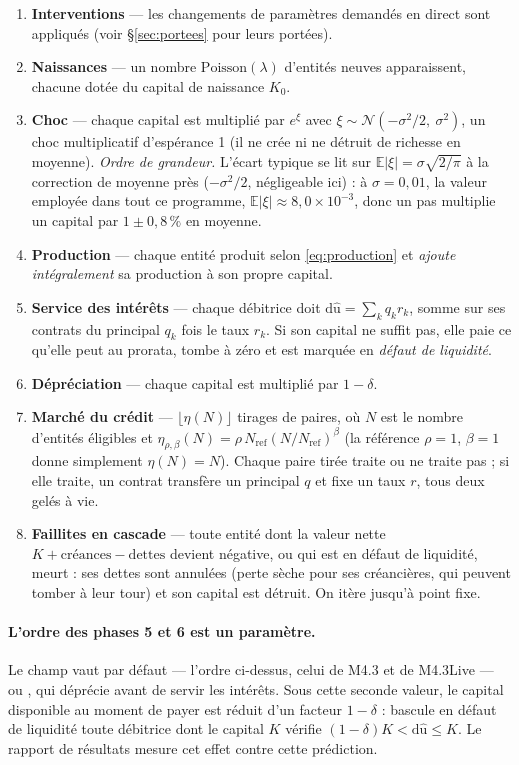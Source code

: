 \begin{enumerate}
\item \textbf{Interventions} --- les changements de paramètres demandés en
  direct sont appliqués (voir §\ref{sec:portees} pour leurs portées).
\item \textbf{Naissances} --- un nombre $\mathrm{Poisson}(\lambda)$ d'entités
  neuves apparaissent, chacune dotée du capital de naissance $K_0$.
\item \textbf{Choc} --- chaque capital est multiplié par $e^{\xi}$ avec
  $\xi \sim \mathcal{N}(-\sigma^2/2,\ \sigma^2)$, un choc multiplicatif
  d'espérance 1 (il ne crée ni ne détruit de richesse en moyenne).
  \emph{Ordre de grandeur.} L'écart typique se lit sur
  $\mathbb{E}|\xi| = \sigma\sqrt{2/\pi}$ à la correction de moyenne près
  ($-\sigma^2/2$, négligeable ici) : à $\sigma = 0{,}01$, la valeur employée
  dans tout ce programme, $\mathbb{E}|\xi| \approx 8{,}0\times10^{-3}$, donc
  un pas multiplie un capital par $1 \pm 0{,}8\,\%$ en moyenne.
\item \textbf{Production} --- chaque entité produit selon
  \eqref{eq:production} et \emph{ajoute intégralement} sa production à son
  propre capital.
\item \textbf{Service des intérêts} --- chaque débitrice doit
  $\mathrm{d\hat u} = \sum_k q_k r_k$, somme sur ses contrats du principal
  $q_k$ fois le taux $r_k$. Si son capital ne suffit pas, elle paie ce
  qu'elle peut au prorata, tombe à zéro et est marquée en \emph{défaut de
  liquidité}.
\item \textbf{Dépréciation} --- chaque capital est multiplié par $1-\delta$.
\item \textbf{Marché du crédit} --- $\lfloor \eta(N) \rfloor$ tirages de
  paires, où $N$ est le nombre d'entités éligibles et
  $\eta_{\rho,\beta}(N) = \rho\,N_{\text{ref}}(N/N_{\text{ref}})^{\beta}$
  (la référence $\rho=1$, $\beta=1$ donne simplement $\eta(N)=N$). Chaque
  paire tirée traite ou ne traite pas ; si elle traite, un contrat transfère
  un principal $q$ et fixe un taux $r$, tous deux gelés à vie.
\item \textbf{Faillites en cascade} --- toute entité dont la valeur nette
  $K + \text{créances} - \text{dettes}$ devient négative, ou qui est en
  défaut de liquidité, meurt : ses dettes sont annulées (perte sèche pour ses
  créancières, qui peuvent tomber à leur tour) et son capital est détruit. On
  itère jusqu'à point fixe.
\end{enumerate}

\paragraph{L'ordre des phases 5 et 6 est un paramètre.} Le champ
 vaut  par défaut --- l'ordre ci-dessus, celui
de M4.3 et de M4.3Live --- ou , qui déprécie avant de
servir les intérêts. Sous cette seconde valeur, le capital disponible au
moment de payer est réduit d'un facteur $1-\delta$ : bascule en défaut de
liquidité toute débitrice dont le capital $K$ vérifie
$(1-\delta)K < \mathrm{d\hat u} \le K$. Le rapport de résultats mesure cet
effet contre cette prédiction.

